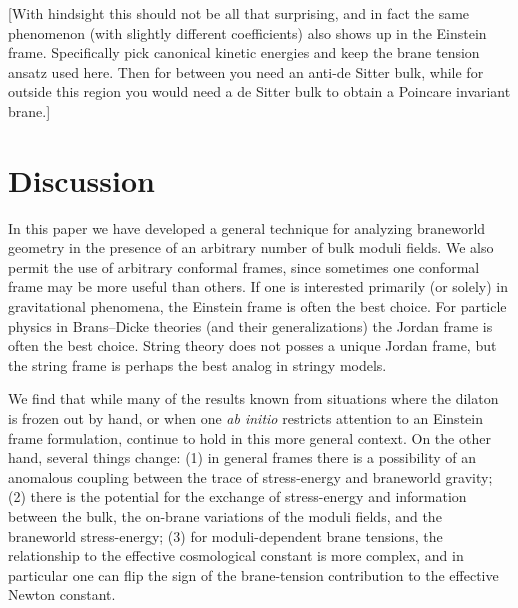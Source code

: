 \documentclass[a4paper,10pt]{article}
\begin{document}
{[With hindsight this should not be all that surprising, and in fact
the same phenomenon (with slightly different coefficients) also shows
up in the Einstein frame. Specifically pick canonical kinetic energies
\coordHE{} and keep the brane tension ansatz \coordHE{} used here. Then for \myHighlight{$\alpha$}\coordHE{} between
\coordHE{} you need an anti-de Sitter bulk, while for
\myHighlight{$\alpha$}\coordHE{} outside this region you would need a de Sitter bulk to obtain
a Poincare invariant brane.]



\section{Discussion}
\label{S:discussion}
\setcounter{equation}{0}

In this paper we have developed a general technique for analyzing
braneworld geometry in the presence of an arbitrary number of bulk
moduli fields. We also permit the use of arbitrary conformal frames,
since sometimes one conformal frame may be more useful than others. If
one is interested primarily (or solely) in gravitational phenomena,
the Einstein frame is often the best choice. For particle physics in
Brans--Dicke theories (and their generalizations) the Jordan frame is
often the best choice. String theory does not posses a unique Jordan
frame, but the string frame is perhaps the best analog in stringy
models.

We find that while many of the results known from situations where the
dilaton is frozen out by hand, or when one {\emph{ab initio}}
restricts attention to an Einstein frame formulation, continue to
hold in this more general context. On the other hand, several things
change: (1) in general frames there is a possibility of an anomalous
coupling between the trace of stress-energy and braneworld gravity;
(2) there is the potential for the exchange of stress-energy and
information between the bulk, the on-brane variations of the moduli
fields, and the braneworld stress-energy; (3) for moduli-dependent
brane tensions, the relationship to the effective cosmological
constant is more complex, and in particular one can flip the sign of
the brane-tension contribution to the effective Newton constant.

}
\end{document}
